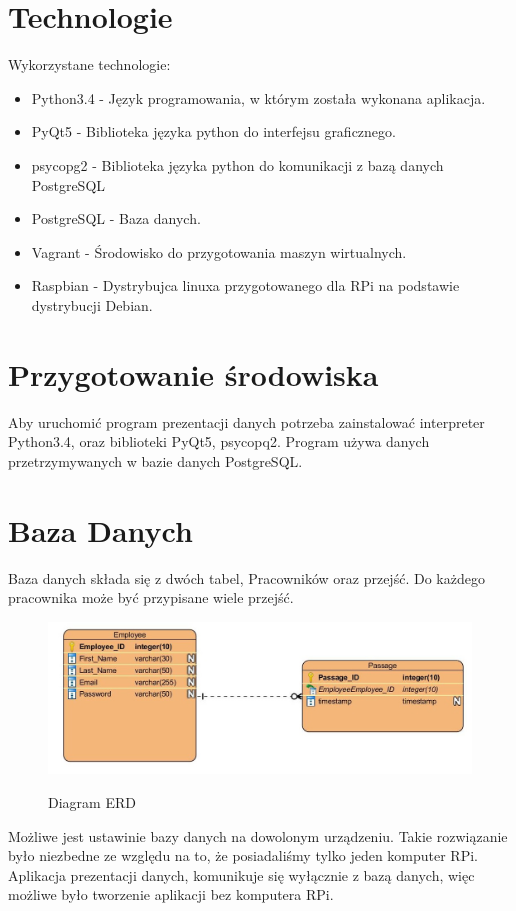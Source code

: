 \section{Technologie}
Wykorzystane technologie:
\begin{itemize}
\item Python3.4 - Język programowania, w którym została wykonana aplikacja.
\item PyQt5 - Biblioteka języka python do interfejsu graficznego.
\item psycopg2 - Biblioteka języka python do komunikacji z bazą danych PostgreSQL
\item PostgreSQL - Baza danych.
\item Vagrant - Środowisko do przygotowania maszyn wirtualnych.
\item Raspbian - Dystrybujca linuxa przygotowanego dla RPi na podstawie dystrybucji Debian.
\end{itemize}
\section{Przygotowanie środowiska}
Aby uruchomić program prezentacji danych potrzeba zainstalować interpreter Python3.4, oraz biblioteki PyQt5, psycopq2. Program używa danych przetrzymywanych w bazie danych PostgreSQL.
\section{Baza Danych}
Baza danych składa się z dwóch tabel, Pracowników oraz przejść. Do każdego pracownika może być przypisane wiele przejść.

\begin{figure}[h!]
	\centering
	\includegraphics[width=\linewidth]{img/ERD_screen.jpg}
	\label{fig:ERD}
	\caption[Diagram ERD]{Diagram ERD}
\end{figure}
Możliwe jest ustawinie bazy danych na dowolonym urządzeniu. Takie rozwiązanie było niezbedne ze względu na to, że posiadaliśmy tylko jeden komputer RPi. Aplikacja prezentacji danych, komunikuje się wyłącznie z bazą danych, więc możliwe było tworzenie aplikacji bez komputera RPi.
